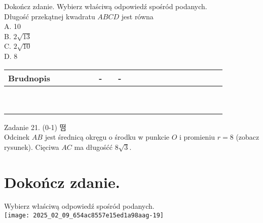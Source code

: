 \documentclass[10pt]{article}
\begin{document}
Dokończ zdanie. Wybierz właściwą odpowiedź spośród podanych.\\
Długość przekątnej kwadratu \(A B C D\) jest równa\\
A. 10\\
B. \(2 \sqrt{13}\)\\
C. \(2 \sqrt{10}\)\\
D. 8

\begin{center}
\begin{tabular}{|c|c|c|c|c|c|c|c|c|c|c|c|c|c|c|c|c|c|c|c|c|c|c|c|}
\hline
\multicolumn{4}{|l|}{Brudnopis} &  &  &  &  &  & - &  & - &  &  &  &  &  &  &  &  &  &  &  &  \\
\hline
 &  &  &  &  &  &  &  &  &  &  &  &  &  &  &  &  &  &  &  &  &  &  &  \\
\hline
 &  &  &  &  &  &  &  &  &  &  &  &  &  &  &  &  &  &  &  &  &  &  &  \\
\hline
 &  &  &  &  &  &  &  &  &  &  &  &  &  &  &  &  &  &  &  &  &  &  &  \\
\hline
 &  &  &  &  &  &  &  &  &  &  &  &  &  &  &  &  &  &  &  &  &  &  &  \\
\hline
 &  &  &  &  &  &  &  &  &  &  &  &  &  &  &  &  &  &  &  &  &  &  &  \\
\hline
 &  &  &  &  &  &  &  &  &  &  &  &  &  &  &  &  &  &  &  &  &  &  &  \\
\hline
 &  &  &  &  &  &  &  &  &  &  &  &  &  &  &  &  &  &  &  &  &  &  &  \\
\hline
 &  &  &  &  &  &  &  &  &  &  &  &  &  &  &  &  &  &  &  &  &  &  &  \\
\hline
 &  &  &  &  &  &  &  &  &  &  &  &  &  &  &  &  &  &  &  &  &  &  &  \\
\hline
\end{tabular}
\end{center}

Zadanie 21. (0-1) 떰\\
Odcinek \(A B\) jest średnicą okręgu o środku w punkcie \(O\) i promieniu \(r=8\) (zobacz rysunek). Cięciwa \(A C\) ma długośćć \(8 \sqrt{3}\).

\section*{Dokończ zdanie.}
Wybierz właściwą odpowiedź spośród podanych.\\
\texttt{[image: 2025\_02\_09\_654ac8557e15ed1a98aag-19]}
\end{document}
